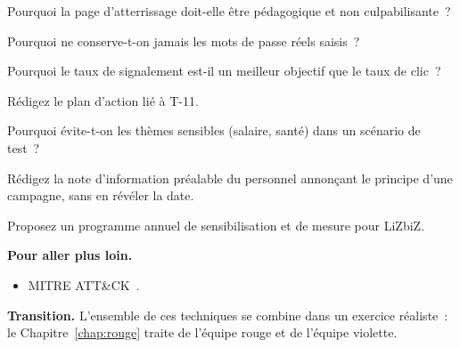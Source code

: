 \begin{boxexo}[title={\ding{45}\quad Exercice~19.4. Page pédagogique \niveaumoyen}]
Pourquoi la page d'atterrissage doit-elle être pédagogique et non
culpabilisante~?
\end{boxexo}

\begin{boxexo}[title={\ding{45}\quad Exercice~19.5. Collecte \niveaumoyen}]
Pourquoi ne conserve-t-on jamais les mots de passe réels saisis~?
\end{boxexo}

\begin{boxexo}[title={\ding{45}\quad Exercice~19.6. Signalement \niveaumoyen}]
Pourquoi le taux de signalement est-il un meilleur objectif que le taux de
clic~?
\end{boxexo}

\begin{boxexo}[title={\ding{45}\quad Exercice~19.7. T-11 \niveaumoyen}]
Rédigez le plan d'action lié à T-11.
\end{boxexo}

\begin{boxexo}[title={\ding{45}\quad Exercice~19.8. Thèmes sensibles \niveaumoyen}]
Pourquoi évite-t-on les thèmes sensibles (salaire, santé) dans un scénario
de test~?
\end{boxexo}

\begin{boxexo}[title={\ding{45}\quad Exercice~19.9. Campagne \niveauexpert}]
Rédigez la note d'information préalable du personnel annonçant le principe
d'une campagne, sans en révéler la date.
\end{boxexo}

\begin{boxexo}[title={\ding{45}\quad Exercice~19.10. Programme \niveauexpert}]
Proposez un programme annuel de sensibilisation et de mesure pour LiZbiZ.
\end{boxexo}

\bigskip

\begin{boxinfo}
\textbf{Pour aller plus loin.}
\begin{itemize}
    \item MITRE ATT\&CK~\cite{mitreattack}.
\end{itemize}
\end{boxinfo}

\begin{boxinfo}
\textbf{Transition.} L'ensemble de ces techniques se combine dans un
exercice réaliste~: le Chapitre~\ref{chap:rouge} traite de l'équipe rouge et
de l'équipe violette.
\end{boxinfo}
